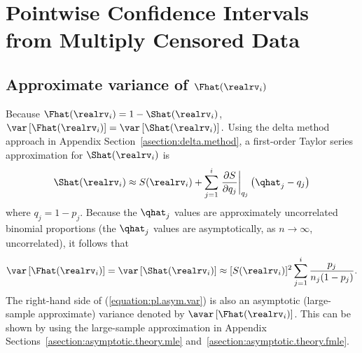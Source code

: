  \section{Pointwise Confidence Intervals from Multiply Censored Data}
\label{section:np.stderror.and.ci}
 \subsection{Approximate variance of $\Fhat(\realrv_{i})$}
\label{section:avar.nonpar.fhat}
Because $\Fhat(\realrv_{i})=1-\Shat(\realrv_{i})$,
$\var
\left [\Fhat(\realrv_{i}) \right ]=
\var \left [\Shat(\realrv_{i}) \right ].$
Using the delta method approach in Appendix
Section~\ref{asection:delta.method}, a first-order Taylor series
approximation for $\Shat(\realrv_{i})$ is
\begin{displaymath}
\Shat(\realrv_{i}) \approx
 S(\realrv_{i})+\sum_{j=1}^{i} 
 \left. \frac{\partial S}{\partial q_{j}} \right |_{q_{j}}
\left(\qhat_{j} - q_{j} \right )
\end{displaymath}
where $q_{j}=1-p_{j}$. 
Because the $\qhat_{j}$ values are approximately
uncorrelated binomial proportions (the $\qhat_{j}$ 
values are asymptotically, 
as $n \rightarrow \infty$, uncorrelated), it follows that
\begin{equation}
\label{equation:pl.asym.var}
 \var \left [\Fhat(\realrv_{i}) \right ]=\var \left [\Shat(\realrv_{i}) \right ] 
\approx [S(\realrv_{i})]^{2}
\sum_{j=1}^{i} \frac{p_{j}}{n_{j} (1-p_{j})}.
\end{equation}
The right-hand side of (\ref{equation:pl.asym.var}) is also an
asymptotic (large-sample approximate) variance denoted by
$\avar
\left [\Fhat(\realrv_{i}) \right ]$.  This can be shown by
using the large-sample approximation in
Appendix Sections~\ref{asection:asymptotic.theory.mle}
and~\ref{asection:asymptotic.theory.fmle}.

